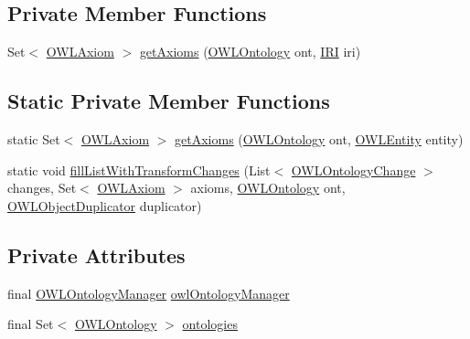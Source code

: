 \subsection*{Private Member Functions}
\begin{DoxyCompactItemize}
\item 
Set$<$ \hyperlink{interfaceorg_1_1semanticweb_1_1owlapi_1_1model_1_1_o_w_l_axiom}{O\-W\-L\-Axiom} $>$ \hyperlink{classorg_1_1semanticweb_1_1owlapi_1_1util_1_1_o_w_l_entity_renamer_a20b6f03a78a36f965cd02778d64a3991}{get\-Axioms} (\hyperlink{interfaceorg_1_1semanticweb_1_1owlapi_1_1model_1_1_o_w_l_ontology}{O\-W\-L\-Ontology} ont, \hyperlink{classorg_1_1semanticweb_1_1owlapi_1_1model_1_1_i_r_i}{I\-R\-I} iri)
\end{DoxyCompactItemize}
\subsection*{Static Private Member Functions}
\begin{DoxyCompactItemize}
\item 
static Set$<$ \hyperlink{interfaceorg_1_1semanticweb_1_1owlapi_1_1model_1_1_o_w_l_axiom}{O\-W\-L\-Axiom} $>$ \hyperlink{classorg_1_1semanticweb_1_1owlapi_1_1util_1_1_o_w_l_entity_renamer_a3ed048d148f769f7c1e4afe2e6365e75}{get\-Axioms} (\hyperlink{interfaceorg_1_1semanticweb_1_1owlapi_1_1model_1_1_o_w_l_ontology}{O\-W\-L\-Ontology} ont, \hyperlink{interfaceorg_1_1semanticweb_1_1owlapi_1_1model_1_1_o_w_l_entity}{O\-W\-L\-Entity} entity)
\item 
static void \hyperlink{classorg_1_1semanticweb_1_1owlapi_1_1util_1_1_o_w_l_entity_renamer_ad2d1660c03fd9e1e83ba8452d93f7978}{fill\-List\-With\-Transform\-Changes} (List$<$ \hyperlink{classorg_1_1semanticweb_1_1owlapi_1_1model_1_1_o_w_l_ontology_change}{O\-W\-L\-Ontology\-Change} $>$ changes, Set$<$ \hyperlink{interfaceorg_1_1semanticweb_1_1owlapi_1_1model_1_1_o_w_l_axiom}{O\-W\-L\-Axiom} $>$ axioms, \hyperlink{interfaceorg_1_1semanticweb_1_1owlapi_1_1model_1_1_o_w_l_ontology}{O\-W\-L\-Ontology} ont, \hyperlink{classorg_1_1semanticweb_1_1owlapi_1_1util_1_1_o_w_l_object_duplicator}{O\-W\-L\-Object\-Duplicator} duplicator)
\end{DoxyCompactItemize}
\subsection*{Private Attributes}
\begin{DoxyCompactItemize}
\item 
final \hyperlink{interfaceorg_1_1semanticweb_1_1owlapi_1_1model_1_1_o_w_l_ontology_manager}{O\-W\-L\-Ontology\-Manager} \hyperlink{classorg_1_1semanticweb_1_1owlapi_1_1util_1_1_o_w_l_entity_renamer_aef52bfe7ef1ea7aed6eb487eb9bd95cb}{owl\-Ontology\-Manager}
\item 
final Set$<$ \hyperlink{interfaceorg_1_1semanticweb_1_1owlapi_1_1model_1_1_o_w_l_ontology}{O\-W\-L\-Ontology} $>$ \hyperlink{classorg_1_1semanticweb_1_1owlapi_1_1util_1_1_o_w_l_entity_renamer_abf2e6e75d68be5a087ef1f6a3773e497}{ontologies}
\end{DoxyCompactItemize}



